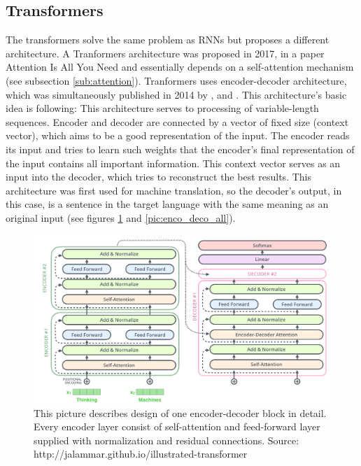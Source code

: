 \subsection{Transformers}
\label{sub:transformers}
The transformers solve the same problem as RNNs but proposes a different architecture. A Tranformers architecture was proposed in 2017, in a paper Attention Is All You Need \citep{Vaswani2017} and essentially depends on a self-attention mechanism (see subsection \ref{sub:attention}). %
Tranformers uses encoder-decoder architecture, which was simultaneously published in 2014 by \citep{Cho2014}, \citep{Sutskever2014} and \citep{Wu2016}. This architecture's basic idea is following: 
This architecture serves to processing of variable-length sequences. Encoder and decoder are connected by a vector of fixed size (context vector), which aims to be a good representation of the input. %
The encoder reads its input and tries to learn such weights that the encoder's final representation of the input contains all important information. This context vector serves as an input into the decoder, which tries to reconstruct the best results. This architecture was first used for machine translation, so the decoder's output, in this case, is a sentence in the target language with the same meaning as an original input (see figures \ref{pic:enco_deco}  and \ref{pic:enco_deco_all}).
\begin{figure}[H]
\centering
\includegraphics[width=1\columnwidth]{../img/trans_arch}
\protect\caption{This picture describes design of one encoder-decoder block in detail. Every encoder layer consist of self-attention and feed-forward layer supplied with normalization and residual connections. Source: http://jalammar.github.io/illustrated-transformer }
\label{pic:enco_deco}
\end{figure}

